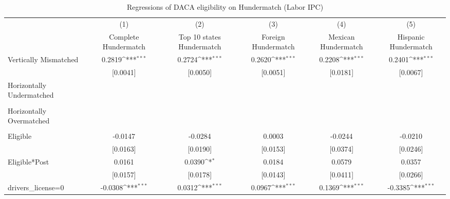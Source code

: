 \begin{table}[htbp]\centering
\def\sym#1{\ifmmode^{#1}\else\(^{#1}\)\fi}
\caption{Regressions of DACA eligibility on Hundermatch (Labor IPC)}
\begin{tabular}{l*{5}{c}}
\toprule
                    &\multicolumn{1}{c}{(1)}         &\multicolumn{1}{c}{(2)}         &\multicolumn{1}{c}{(3)}         &\multicolumn{1}{c}{(4)}         &\multicolumn{1}{c}{(5)}         \\
                    &Complete Hundermatch         &Top 10 states Hundermatch         &Foreign Hundermatch         &Mexican Hundermatch         &Hispanic Hundermatch         \\
\midrule
Vertically Mismatched&      0.2819\sym{***}&      0.2724\sym{***}&      0.2620\sym{***}&      0.2208\sym{***}&      0.2401\sym{***}\\
                    &    [0.0041]         &    [0.0050]         &    [0.0051]         &    [0.0181]         &    [0.0067]         \\
\addlinespace
Horizontally Undermatched&                     &                     &                     &                     &                     \\
                    &                     &                     &                     &                     &                     \\
\addlinespace
Horizontally Overmatched&                     &                     &                     &                     &                     \\
                    &                     &                     &                     &                     &                     \\
\addlinespace
Eligible            &     -0.0147         &     -0.0284         &      0.0003         &     -0.0244         &     -0.0210         \\
                    &    [0.0163]         &    [0.0190]         &    [0.0153]         &    [0.0374]         &    [0.0246]         \\
\addlinespace
Eligible*Post       &      0.0161         &      0.0390\sym{*}  &      0.0184         &      0.0579         &      0.0357         \\
                    &    [0.0157]         &    [0.0178]         &    [0.0143]         &    [0.0411]         &    [0.0266]         \\
\addlinespace
drivers\_license=0   &     -0.0308\sym{***}&      0.0312\sym{***}&      0.0967\sym{***}&      0.1369\sym{***}&     -0.3385\sym{***}\\

\end{tabular}
\end{table}
